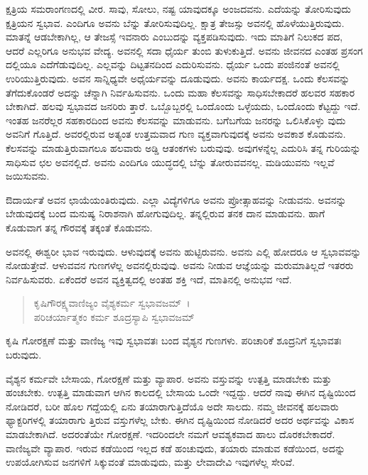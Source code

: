ಕ್ಷತ್ರಿಯ ಸಮರಾಂಗಣದಲ್ಲಿ ವೀರ. ಸಾವು, ಸೋಲು, ನಷ್ಟ ಯಾವುದಕ್ಕೂ ಅಂಜದವನು. ಎದೆಯನ್ನು ತೋರಿಸುವುದು ಕ್ಷತ್ರಿಯನ ಸ್ವಭಾವ. ಎಂದಿಗೂ ಅವನು ಬೆನ್ನು ತೋರಿಸುವುದಿಲ್ಲ. ಕ್ಷಾತ್ರ ತೇಜಸ್ಸು ಅವನಲ್ಲಿ ಹೊಳೆಯುತ್ತಿರುವುದು. ಮಾತನ್ನೆ ಆಡಬೇಕಾಗಿಲ್ಲ, ಆ ತೇಜಸ್ಸೆ ಇವನಾರು ಎಂಬುದನ್ನು ವ್ಯಕ್ತಪಡಿಸುವುದು. ಇದು ಮಾತಿಗೆ ನಿಲುಕದ ಪದ, ಆದರೆ ಎಲ್ಲರಿಗೂ ಅನುಭವ ವೇದ್ಯ. ಅವನಲ್ಲಿ ಸದಾ ಧೈರ್ಯ ತುಂಬಿ ತುಳುಕುತ್ತಿದೆ. ಅವನು ಜೀವನದ ಎಂತಹ ಪ್ರಸಂಗ ದಲ್ಲಿಯೂ ಎದೆಗೆಡುವುದಿಲ್ಲ. ಎಲ್ಲವನ್ನು ದಿಟ್ಟತನದಿಂದ ಎದುರಿಸುವನು. ಧೈರ್ಯ ಒಂದು ಪಂಜಿನಂತೆ ಅವನಲ್ಲಿ ಉರಿಯುತ್ತಿರುವುದು. ಅವನ ಸಾನ್ನಿಧ್ಯವೇ ಅಧೈರ್ಯವನ್ನು ದೂಡುವುದು. ಅವನು ಕಾರ್ಯದಕ್ಷ. ಒಂದು ಕೆಲಸವನ್ನು ತೆಗೆದುಕೊಂಡರೆ ಅದನ್ನು ಚೆನ್ನಾಗಿ ನಿರ್ವಹಿಸುವನು. ಒಂದು ಮಹಾ ಕೆಲಸವನ್ನು ಸಾಧಿಸಬೇಕಾದರೆ ಹಲವರ ಸಹಕಾರ ಬೇಕಾಗಿದೆ. ಹಲವು ಸ್ವಭಾವದ ಜನರಿರು ತ್ತಾರೆ. ಒಬ್ಬೊಬ್ಬರಲ್ಲಿ ಒಂದೊಂದು ಒಳ್ಳೆಯದು, ಒಂದೊಂದು ಕೆಟ್ಟದ್ದು ಇದೆ. ಇಂತಹ ಜನರೆಲ್ಲರ ಸಹಕಾರದಿಂದ ಅವನು ಕೆಲಸವನ್ನು ಮಾಡುವನು. ಬಗೆಬಗೆಯ ಜನರನ್ನು ಒಲಿಸಿಕೊಳ್ಳು ವುದು ಅವನಿಗೆ ಗೊತ್ತಿದೆ. ಅವರಲ್ಲಿರುವ ಅತ್ಯಂತ ಉತ್ತಮವಾದ ಗುಣ ವ್ಯಕ್ತವಾಗುವುದಕ್ಕೆ ಅವನು ಅವಕಾಶ ಕೊಡುವನು. ಕೆಲಸವನ್ನು ಮಾಡುತ್ತಿರುವಾಗಲೂ ಹಲವಾರು ಅಡ್ಡಿ ಆತಂಕಗಳು ಬರುವುವು. ಅವುಗಳನ್ನೆಲ್ಲ ಎದುರಿಸಿ ತನ್ನ ಗುರಿಯನ್ನು ಸಾಧಿಸುವ ಛಲ ಅವನಲ್ಲಿದೆ. ಅವನು ಎಂದಿಗೂ ಯುದ್ಧದಲ್ಲಿ ಬೆನ್ನು ತೋರುವವನಲ್ಲ. ಮಡಿಯುವನು ಇಲ್ಲವೆ ಜಯಿಸುವನು.

ಔದಾರ್ಯತೆ ಅವನ ಛಾಯೆಯಂತಿರುವುದು. ಎಲ್ಲಾ ವಿದ್ಯೆಗಳಿಗೂ ಅವನು ಪ್ರೋತ್ಸಾಹವನ್ನು ನೀಡುವನು. ಅವನನ್ನು ಬೇಡುವುದಕ್ಕೆ ಬಂದ ಮನುಷ್ಯ ನಿರಾಶನಾಗಿ ಹೋಗುವುದಿಲ್ಲ. ತನ್ನಲ್ಲಿರುವ ತನಕ ದಾನ ಮಾಡುವನು. ಹಾಗೆ ಕೊಡುವಾಗ ತನ್ನ ಗೌರವಕ್ಕೆ ತಕ್ಕಂತೆ ಕೊಡುವನು.

ಅವನಲ್ಲಿ ಈಶ್ವರೀ ಭಾವ ಇರುವುದು. ಆಳುವುದಕ್ಕೆ ಅವನು ಹುಟ್ಟಿರುವನು. ಅವನು ಎಲ್ಲಿ ಹೋದರೂ ಆ ಸ್ವಭಾವವನ್ನು ನೋಡುತ್ತೇವೆ. ಆಳುವವನ ಗುಣಗಳೆಲ್ಲ ಅವನಲ್ಲಿರುವುವು. ಅವನು ನೀಡುವ ಆಜ್ಞೆಯನ್ನು ಮರುಮಾತಿಲ್ಲದೆ ಇತರರು ನಿರ್ವಹಿಸುವರು. ಏಕೆಂದರೆ ಅವನ ವ್ಯಕ್ತಿತ್ವದಲ್ಲಿ ಅಂತಹ ಶಕ್ತಿ ಇದೆ, ಮಾತಿನಲ್ಲಿ ಅನುಭವ ಇದೆ.

\begin{verse}
ಕೃಷಿಗೌರಕ್ಷ್ಯವಾಣಿಜ್ಯಂ ವೈಶ್ಯಕರ್ಮ ಸ್ವಭಾವಜಮ್~।\\ಪರಿಚರ್ಯಾತ್ಮಕಂ ಕರ್ಮ ಶೂದ್ರಸ್ಯಾಪಿ ಸ್ವಭಾವಜಮ್ 
\end{verse}

{\small ಕೃಷಿ ಗೋರಕ್ಷಣೆ ಮತ್ತು ವಾಣಿಜ್ಯ ಇವು ಸ್ವಭಾವತಃ ಬಂದ ವೈಶ್ಯನ ಗುಣಗಳು. ಪರಿಚಾರಿಕೆ ಶೂದ್ರನಿಗೆ ಸ್ವಭಾವತಃ ಬರುವುದು.}

ವೈಶ್ಯನ ಕರ್ಮವೇ ಬೇಸಾಯ, ಗೋರಕ್ಷಣೆ ಮತ್ತು ವ್ಯಾಪಾರ. ಅವನು ವಸ್ತುವನ್ನು ಉತ್ಪತ್ತಿ ಮಾಡಬೇಕು ಮತ್ತು ಹಂಚಬೇಕು. ಉತ್ಪತ್ತಿ ಮಾಡುವಾಗ ಆಗಿನ ಕಾಲದಲ್ಲಿ ಬೇಸಾಯ ಒಂದೇ ಇದ್ದದ್ದು. ಆದರೆ ನಾವು ಈಗಿನ ದೃಷ್ಟಿಯಿಂದ ನೋಡಿದರೆ, ಬರೀ ಹೊಲ ಗದ್ದೆಯಲ್ಲಿ ಏನು ತಯಾರಾಗುತ್ತಿದೆಯೊ ಅದೇ ಸಾಲದು. ನಮ್ಮ ಜೀವನಕ್ಕೆ ಹಲವಾರು ಫ್ಯಾಕ್ಟರಿಗಳಲ್ಲಿ ತಯಾರಾಗು ತ್ತಿರುವ ವಸ್ತುಗಳೆಲ್ಲ ಬೇಕು. ಈಗಿನ ದೃಷ್ಟಿಯಿಂದ ನೋಡಿದರೆ ಅದರ ಅರ್ಥವನ್ನು ವಿಕಾಸ ಮಾಡಬೇಕಾಗಿದೆ. ಅದರಂತೆಯೇ ಗೋರಕ್ಷಣೆ. ಇದರಿಂದಲೇ ನಮಗೆ ಆವಶ್ಯಕವಾದ ಹಾಲು ದೊರಕಬೇಕಾದರೆ. ವಾಣಿಜ್ಯವೇ ವ್ಯಾಪಾರ. ಇರುವ ಕಡೆಯಿಂದ ಇಲ್ಲದ ಕಡೆ ಹಂಚುವುದು, ತಯಾರು ಮಾಡುವ ಕಡೆಯಿಂದ, ಅದನ್ನು ಉಪಯೋಗಿಸುವ ಜನಗಳಿಗೆ ಸಿಕ್ಕುವಂತೆ ಮಾಡುವುದು, ಮತ್ತು ಲೇವಾದೇವಿ ಇವುಗಳೆಲ್ಲ ಸೇರಿವೆ.

